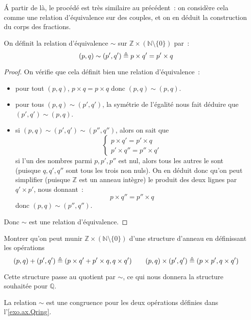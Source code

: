 \'A partir de là, le procédé est très similaire au précédent~: on considère cela
comme une relation d'équivalence sur des couples, et on en déduit la
construction du corps des fractions.

\begin{definition}
  On définit la relation d'équivalence $\sim$ sur
  $\mathbb Z \times (\mathbb N\setminus\{0\})$ par~:
  \[(p,q) \sim (p',q') \triangleq p\times q' = p'\times q\]
\end{definition}

\begin{proof}
  On vérifie que cela définit bien une relation d'équivalence~:
  \begin{itemize}
  \item pour tout $(p,q)$, $p\times q = p \times q$ donc $(p,q)\sim(p,q)$.
  \item pour tous $(p,q)\sim (p',q')$, la symétrie de l'égalité nous fait
    déduire que $(p',q')\sim(p,q)$.
  \item si $(p,q)\sim(p',q')\sim(p'',q'')$, alors on sait que
    \[\left\{\begin{array}{l}
    p\times q' = p' \times q\\
    p' \times q'' = p'' \times q'
    \end{array}\right.\]
    si l'un des nombres parmi $p,p',p''$ est nul, alors tous les autres le sont
    (puisque $q,q',q''$ sont tous les trois non nuls). On en déduit donc qu'on
    peut simplifier (puisque $\mathbb Z$ est un anneau intègre) le produit des
    deux lignes par $q'\times p'$, nous donnant~:
    \[p\times q'' = p'' \times q\]
    donc $(p,q)\sim(p'',q'')$.
  \end{itemize}
  Donc $\sim$ est une relation d'équivalence.
\end{proof}

\begin{exercise}\label{exo.ax.Qring}
  Montrer qu'on peut munir $\mathbb Z\times (\mathbb N\setminus\{0\})$ d'une
  structure d'anneau en définissant les opérations
  \[(p,q)+(p',q') \triangleq (p\times q' + p' \times q, q\times q')\qquad
  (p,q)\times(p',q')\triangleq (p\times p',q\times q')\]
\end{exercise}

Cette structure passe au quotient par $\sim$, ce qui nous donnera la structure
souhaitée pour $\mathbb Q$.

\begin{proposition}
  La relation $\sim$ est une congruence pour les deux opérations définies dans
  l'\cref{exo.ax.Qring}.
\end{proposition}

